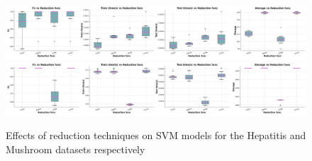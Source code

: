 \begin{figure}
    \centering
    \includegraphics[width=\textwidth]{figures/SVM_reduction_effects_hepatitis.png}
    \includegraphics[width=\textwidth]{figures/SVM_reduction_effects_mushroom.png}
    \caption{Effects of reduction techniques on SVM models for the Hepatitis and Mushroom datasets respectively}
    \label{fig:SVM-reduction-effects}
\end{figure}



